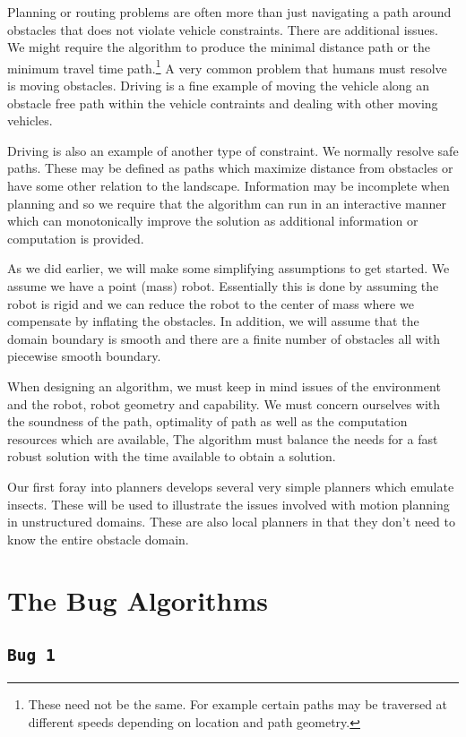 Planning or routing problems are often more than just navigating a path
around obstacles that does not violate vehicle constraints. There are
additional issues. We might require the algorithm to produce the minimal
distance path or the minimum travel time path.\footnote{These need not
  be the same. For example certain paths may be traversed at different
  speeds depending on location and path geometry.} A very common problem
that humans must resolve is moving obstacles. Driving is a fine example
of moving the vehicle along an obstacle free path within the vehicle
contraints and dealing with other moving vehicles.

Driving is also an example of another type of constraint. We normally
resolve safe paths. These may be defined as paths which maximize
distance from obstacles or have some other relation to the landscape.
Information may be incomplete when planning and so we require that the
algorithm can run in an interactive manner which can monotonically
improve the solution as additional information or computation is
provided.

As we did earlier, we will make some simplifying assumptions to get
started. We assume we have a point (mass) robot. Essentially this is
done by assuming the robot is rigid and we can reduce the robot to the
center of mass where we compensate by inflating the obstacles. In
addition, we will assume that the domain boundary is smooth and there
are a finite number of obstacles all with piecewise smooth boundary.

When designing an algorithm, we must keep in mind issues of the
environment and the robot, robot geometry and capability. We must
concern ourselves with the soundness of the path, optimality of path as
well as the computation resources which are available, The algorithm
must balance the needs for a fast robust solution with the time
available to obtain a solution.

Our first foray into planners develops several very simple planners
which emulate insects. These will be used to illustrate the issues
involved with motion planning in unstructured domains. These are also
local planners in that they don't need to know the entire obstacle
domain.

\hypertarget{the-bug-algorithms}{%
\section{The Bug Algorithms}\label{the-bug-algorithms}}

\hypertarget{bug-1}{%
\subsection{\texorpdfstring{\texttt{Bug\ 1}}{Bug 1}}\label{bug-1}}

